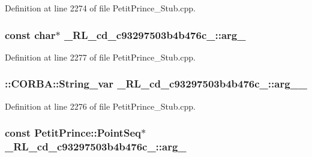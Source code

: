 Definition at line 2274 of file Petit\+Prince\+\_\+\+Stub.\+cpp.

\subsubsection[{\texorpdfstring{arg\+\_\+0}{arg_0}}]{\setlength{\rightskip}{0pt plus 5cm}const char$\ast$ \+\_\+R\+L\+\_\+cd\+\_\+c93297503b4b476c\+\_\+::arg\+\_}\hypertarget{class__0_r_l__cd__c93297503b4b476c__51000000_a81e981035dd946f135928f6dbca1567f}{}\label{class__0_r_l__cd__c93297503b4b476c__51000000_a81e981035dd946f135928f6dbca1567f}


Definition at line 2277 of file Petit\+Prince\+\_\+\+Stub.\+cpp.

\subsubsection[{\texorpdfstring{arg\+\_\+0\+\_\+}{arg_0_}}]{\setlength{\rightskip}{0pt plus 5cm}\+::C\+O\+R\+B\+A\+::\+String\+\_\+var \+\_\+R\+L\+\_\+cd\+\_\+c93297503b4b476c\+\_\+::arg\+\_\+\_\+}\hypertarget{class__0_r_l__cd__c93297503b4b476c__51000000_ad86d0df67a8dfd4a7b88a247aebbfe67}{}\label{class__0_r_l__cd__c93297503b4b476c__51000000_ad86d0df67a8dfd4a7b88a247aebbfe67}


Definition at line 2276 of file Petit\+Prince\+\_\+\+Stub.\+cpp.

\subsubsection[{\texorpdfstring{arg\+\_\+1}{arg_1}}]{\setlength{\rightskip}{0pt plus 5cm}const Petit\+Prince\+::\+Point\+Seq$\ast$ \+\_\+R\+L\+\_\+cd\+\_\+c93297503b4b476c\+\_\+::arg\+\_}\hypertarget{class__0_r_l__cd__c93297503b4b476c__51000000_a7a12cf2b92afccb92f38ae00be0d91d8}{}\label{class__0_r_l__cd__c93297503b4b476c__51000000_a7a12cf2b92afccb92f38ae00be0d91d8}


